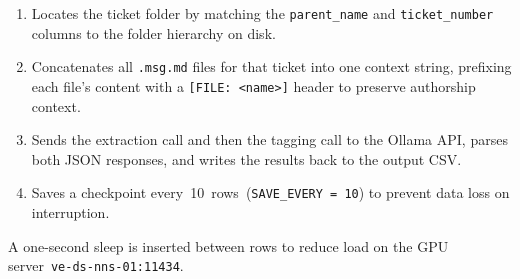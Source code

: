 \begin{enumerate}
    \item Locates the ticket folder by matching the \texttt{parent\_name} and
          \texttt{ticket\_number} columns to the folder hierarchy on disk.
    \item Concatenates all \texttt{.msg.md} files for that ticket into one
          context string, prefixing each file's content with a
          \verb|[FILE: <name>]| header to preserve authorship context.
    \item Sends the extraction call and then the tagging call to the Ollama
          API, parses both JSON responses, and writes the results back to the
          output CSV.
    \item Saves a checkpoint every~10~rows~(\texttt{SAVE\_EVERY~=~10}) to
          prevent data loss on interruption.
\end{enumerate}

A one-second sleep is inserted between rows to reduce load on the GPU
server~\texttt{ve-ds-nns-01:11434}.
